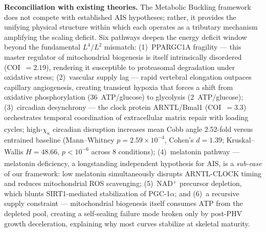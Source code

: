 \documentclass[12pt]{article}
\begin{document}
\textbf{Reconciliation with existing theories.} The Metabolic Buckling framework does not compete with established AIS hypotheses; rather, it provides the unifying physical structure within which each operates as a tributary mechanism amplifying the scaling deficit. Six pathways deepen the energy deficit window beyond the fundamental $L^4/L^2$ mismatch: (1)~PPARGC1A fragility --- this master regulator of mitochondrial biogenesis is itself intrinsically disordered (COI~$= 2.19$), rendering it susceptible to proteasomal degradation under oxidative stress; (2)~vascular supply lag --- rapid vertebral elongation outpaces capillary angiogenesis, creating transient hypoxia that forces a shift from oxidative phosphorylation (36~ATP/glucose) to glycolysis (2~ATP/glucose); (3)~circadian desynchrony --- the clock protein ARNTL/Bmal1 (COI~$= 3.3$) orchestrates temporal coordination of extracellular matrix repair with loading cycles\textsuperscript{\cite{dudek2017}}; high-$\chi_\kappa$ circadian disruption increases mean Cobb angle 2.52-fold versus entrained baseline (Mann--Whitney $p = 2.59 \times 10^{-4}$, Cohen's $d = 1.39$; Kruskal--Wallis $H = 48.66$, $p < 10^{-6}$ across 8 conditions)\textsuperscript{\cite{carskadon2011}}; (4)~melatonin pathway --- melatonin deficiency, a longstanding independent hypothesis for AIS\textsuperscript{\cite{moreau2004}}, is a \emph{sub-case} of our framework: low melatonin simultaneously disrupts ARNTL-CLOCK timing and reduces mitochondrial ROS scavenging; (5)~NAD$^+$ precursor depletion, which blunts SIRT1-mediated stabilization of PGC-1$\alpha$; and (6)~a recursive supply constraint --- mitochondrial biogenesis itself consumes ATP from the depleted pool, creating a self-sealing failure mode broken only by post-PHV growth deceleration, explaining why most curves stabilize at skeletal maturity.
\end{document}
